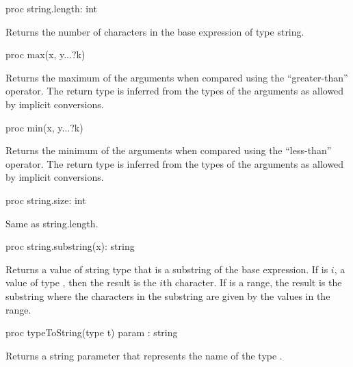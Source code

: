 \begin{protohead}
proc string.length: int
\end{protohead}
\begin{protobody}
Returns the number of characters in the base expression of type string.
\end{protobody}

\begin{protohead}
proc max(x, y...?k)
\end{protohead}
\begin{protobody}
Returns the maximum of the arguments when compared using the
``greater-than'' operator.  The return type is inferred from the types
of the arguments as allowed by implicit conversions.
\end{protobody}

\begin{protohead}
proc min(x, y...?k)
\end{protohead}
\begin{protobody}
Returns the minimum of the arguments when compared using the
``less-than'' operator.  The return type is inferred from the types of
the arguments as allowed by implicit conversions.
\end{protobody}

\begin{protohead}
proc string.size: int
\end{protohead}
\begin{protobody}
Same as string.length.
\end{protobody}

\begin{protohead}
proc string.substring(x): string
\end{protohead}
\begin{protobody}
Returns a value of string type that is a substring of the base
expression.  If  is $i$, a value of type , then the
result is the $i$th character.  If  is a range, the result is
the substring where the characters in the substring are given by the
values in the range.
\end{protobody}

\begin{protohead}
proc typeToString(type t) param : string
\end{protohead}
\begin{protobody}
Returns a string parameter that represents the name of the
type .
\end{protobody}

